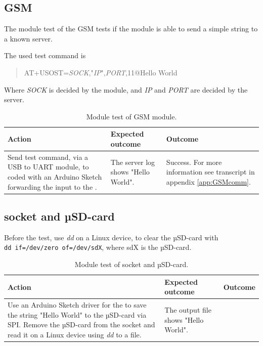 \subsection{GSM \SARA}
The module test of the GSM \SARA tests if the module is able to send a simple string to a known server.

The used test command is
\begin{quote}
	AT+USOST=\textit{SOCK},"\textit{IP}",\textit{PORT},11@Hello World
\end{quote}
Where \textit{SOCK} is decided by the \SARA module, and \textit{IP} and \textit{PORT} are decided by the server.

\begin{table}[H]
	\centering
	\begin{tabularx}{\textwidth}{p{4.3cm} X X}
		\toprule
		\textbf{Action} & \textbf{Expected outcome} & \textbf{Outcome} \\
		\midrule
		Send test command, via a USB to UART module, to \MKR coded with an Arduino Sketch forwarding the input to the \SARA. & The server log shows "Hello World". & Success. For more information see transcript in appendix \cref{app:GSMcomm}. \\
		\bottomrule
	\end{tabularx}
	\caption{Module test of \SARA GSM module.}
	\label{AT:modGSM}
\end{table}

\subsection{\SDsock socket and µSD-card}
Before the test, use \textit{dd} on a Linux device, to clear the µSD-card with \\
\texttt{dd if=/dev/zero of=/dev/sdX}, where sdX is the µSD-card.

\begin{table}[H]
	\centering
	\begin{tabularx}{\textwidth}{p{4.3cm} X X}
		\toprule
		\textbf{Action} & \textbf{Expected outcome} & \textbf{Outcome} \\
		\midrule
		Use an Arduino Sketch driver for the \MKR to save the string "Hello World" to the µSD-card via SPI.
		Remove the µSD-card from the \SDsock socket and read it on a Linux device using \textit{dd} to a file. & The output file shows "Hello World". & \\
		\bottomrule
	\end{tabularx}
	\caption{Module test of \SDsock socket and µSD-card.}
	\label{AT:modSD}
\end{table}

